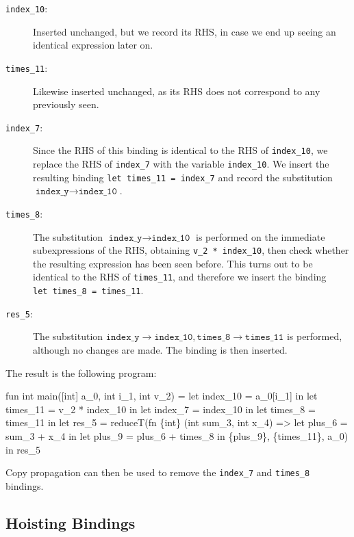 \begin{description}
\item[\texttt{index\_10}:] Inserted unchanged, but we record its RHS,
  in case we end up seeing an identical expression later on.
\item[\texttt{times\_11}:] Likewise inserted unchanged, as its RHS
  does not correspond to any previously seen.
\item[\texttt{index\_7}:] Since the RHS of this binding is identical
  to the RHS of \texttt{index\_10}, we replace the RHS of
  \texttt{index\_7} with the variable \texttt{index\_10}.  We insert
  the resulting binding \texttt{let~times\_11~=~index\_7} and record
  the substitution $\texttt{index\_y}\rightarrow\texttt{index\_10}$.
\item[\texttt{times\_8}:] The substitution
  $\texttt{index\_y}\rightarrow\texttt{index\_10}$ is performed on the
  immediate subexpressions of the RHS, obtaining
  \texttt{v\_2~*~index\_10}, then check whether the resulting
  expression has been seen before.  This turns out to be identical to
  the RHS of \texttt{times\_11}, and therefore we insert the binding
  \texttt{let~times\_8~=~times\_11}.
\item[\texttt{res\_5}:] The substitution
  $\texttt{index\_y}\rightarrow\texttt{index\_10},\texttt{times\_8}\rightarrow\texttt{times\_11}$
  is performed, although no changes are made.  The binding is then
  inserted.
\end{description}

The result is the following program:

\begin{colorcode}
fun int main([int] a_0, int i_1, int v_2) =
  let index_10 = a_0[i_1] in
  let times_11 = v_2 * index_10 in
  let index_7 = index_10 in
  let times_8 = times_11 in
  let {res_5} =
    reduceT(fn \{int\} (int sum_3, int x_4) =>
              let plus_6 = sum_3 + x_4 in
              let plus_9 = plus_6 + times_8 in
              \{plus_9\},
            \{times_11\}, a_0) in
  res_5
\end{colorcode}

Copy propagation can then be used to remove the \texttt{index\_7} and
\texttt{times\_8} bindings.

\subsection{Hoisting Bindings}
\label{sec:hoisting-bindings}

